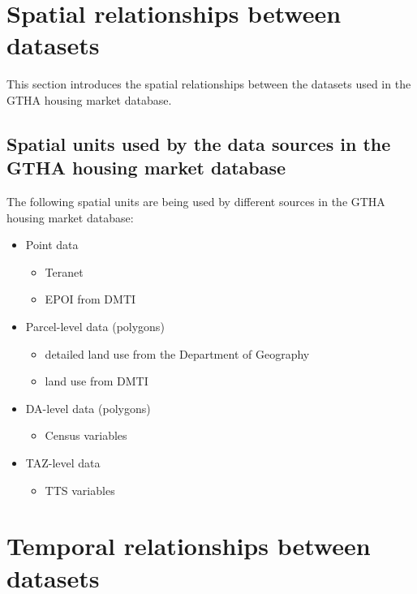 \section{Spatial relationships between datasets} \label{sec:spatial_relationships}

This section introduces the spatial relationships between the datasets used in the GTHA housing market database.


\subsection{Spatial units used by the data sources in the GTHA housing market database} \label{subsec:spatial_units_used_in_database}

The following spatial units are being used by different sources in the GTHA housing market database:

\begin{itemize}
    \item Point data
    \begin{itemize}
        \item Teranet
        \item EPOI from DMTI
    \end{itemize}
    \item Parcel-level data (polygons)
    \begin{itemize}
        \item detailed land use from the Department of Geography
        \item land use from DMTI
    \end{itemize}
    \item DA-level data (polygons)
    \begin{itemize}
        \item Census variables
    \end{itemize}
    \item TAZ-level data
    \begin{itemize}
        \item TTS variables
    \end{itemize}
\end{itemize}


\section{Temporal relationships between datasets} \label{sec:termporal_relationships_between_datasets}

